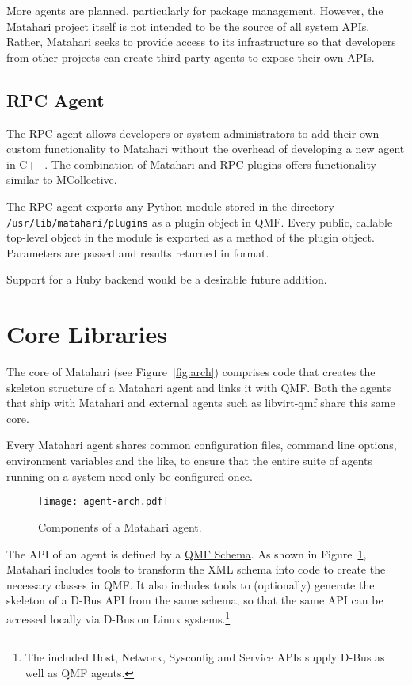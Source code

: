 \documentclass{tufte-handout}
\begin{document}
More agents are planned, particularly for package management.
However, the Matahari project itself is not intended to be the source of all system APIs. Rather, Matahari seeks to provide access to its infrastructure so that developers from other projects can create third-party agents to expose their own APIs.

\subsection{RPC Agent}

The RPC agent allows developers or system administrators to add their own custom functionality to Matahari without the overhead of developing a new agent in C++. The combination of Matahari and RPC plugins offers functionality similar to MCollective.

The RPC agent exports any Python module stored in the directory \Verb|/usr/lib/matahari/plugins| as a plugin object in QMF. Every public, callable top-level object in the module is exported as a method of the plugin object. Parameters are passed and results returned in  format.

Support for a Ruby backend would be a desirable future addition.

\section{Core Libraries}

The core of Matahari (see Figure~\ref{fig:arch}) comprises code that creates the skeleton structure of a Matahari agent and links it with QMF. Both the agents that ship with Matahari and external agents such as libvirt-qmf share this same core.

Every Matahari agent shares common configuration files, command line options, environment variables and the like, to ensure that the entire suite of agents running on a system need only be configured once.

\begin{figure}[hbt]
\texttt{[image: agent-arch.pdf]}
\caption{Components of a Matahari agent.}
\label{fig:agent-arch}
\end{figure}

The API of an agent is defined by a \href{https://cwiki.apache.org/qpid/qpid-management-framework.html#QpidManagementFramework-Schema}{QMF Schema}. As shown in Figure~\ref{fig:agent-arch}, Matahari includes tools to transform the XML schema into code to create the necessary classes in QMF.
It also includes tools to (optionally) generate the skeleton of a D-Bus API from the same schema, so that the same API can be accessed locally via D-Bus on Linux systems.\footnote{The included Host, Network, Sysconfig and Service APIs supply D-Bus as well as QMF agents.}
\end{document}
